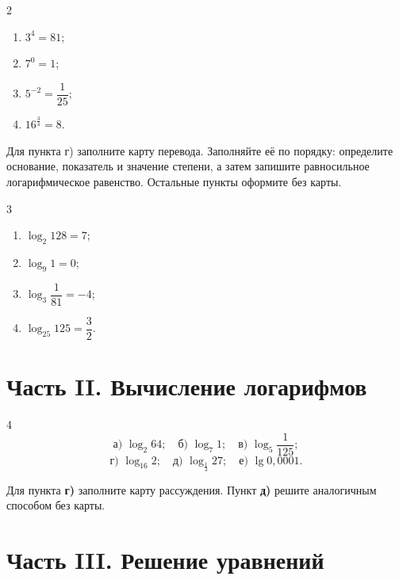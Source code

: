 \begin{homeworktask}{2}
  \begin{enumerate}[itemsep=0.45em]
    \item[\textbf{а)}] \(3^4=81\);
    \item[\textbf{б)}] \(7^0=1\);
    \item[\textbf{в)}] \(5^{-2}=\dfrac1{25}\);
    \item[\textbf{г)}] \(16^{\frac34}=8\).
  \end{enumerate}
\end{homeworktask}
Для пункта г) заполните карту перевода. Заполняйте её по порядку: определите
основание, показатель и значение степени, а затем запишите равносильное
логарифмическое равенство. Остальные пункты оформите без карты.
\logtranslationmap

\begin{homeworktask}{3}
  \begin{enumerate}[itemsep=0.45em]
    \item[\textbf{а)}] \(\log_2 128=7\);
    \item[\textbf{б)}] \(\log_9 1=0\);
    \item[\textbf{в)}] \(\log_3\dfrac1{81}=-4\);
    \item[\textbf{г)}] \(\log_{25}125=\dfrac32\).
  \end{enumerate}
\end{homeworktask}
\answerspace{28mm}

\newpage
\section*{Часть II. Вычисление логарифмов}

\begin{homeworktask}{4}
  \[
    \text{а) }\log_2 64;
    \quad
    \text{б) }\log_7 1;
    \quad
    \text{в) }\log_5\frac1{125};
  \]
  \[
    \text{г) }\log_{16}2;
    \quad
    \text{д) }\log_{\frac13}27;
    \quad
    \text{е) }\lg0{,}0001.
  \]

  Для пункта \textbf{г)} заполните карту рассуждения. Пункт \textbf{д)}
  решите аналогичным способом без карты.
\end{homeworktask}
\logcalculationmap

\section*{Часть III. Решение уравнений}

